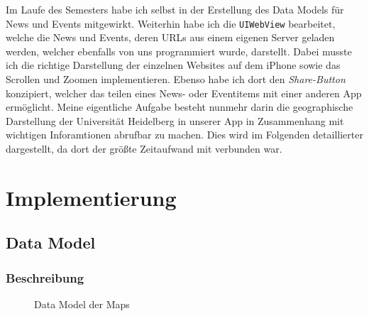 \documentclass{scrreprt}
\begin{document}
Im Laufe des Semesters habe ich selbst in der Erstellung des Data Models für News und Events mitgewirkt. Weiterhin habe ich die \texttt{UIWebView} bearbeitet, welche die News und Events, deren URLs aus einem eigenen Server geladen werden, welcher ebenfalls von uns programmiert wurde, darstellt. Dabei musste ich die richtige Darstellung der einzelnen Websites auf dem iPhone sowie das Scrollen und Zoomen implementieren. Ebenso habe ich dort den \emph{Share-Button} konzipiert, welcher das teilen eines News- oder Eventitems mit einer anderen App ermöglicht. Meine eigentliche Aufgabe besteht nunmehr darin die geographische Darstellung der Universität Heidelberg in unserer App in Zusammenhang mit wichtigen Inforamtionen abrufbar zu machen. Dies wird im Folgenden detaillierter dargestellt, da dort der größte Zeitaufwand mit verbunden war.





\newpage
\chapter{Implementierung}

\section{Data Model}

\subsection{Beschreibung}

\begin{figure}[ht]
\centering {}
\caption{Data Model der Maps}
\end{figure}
\end{document}
